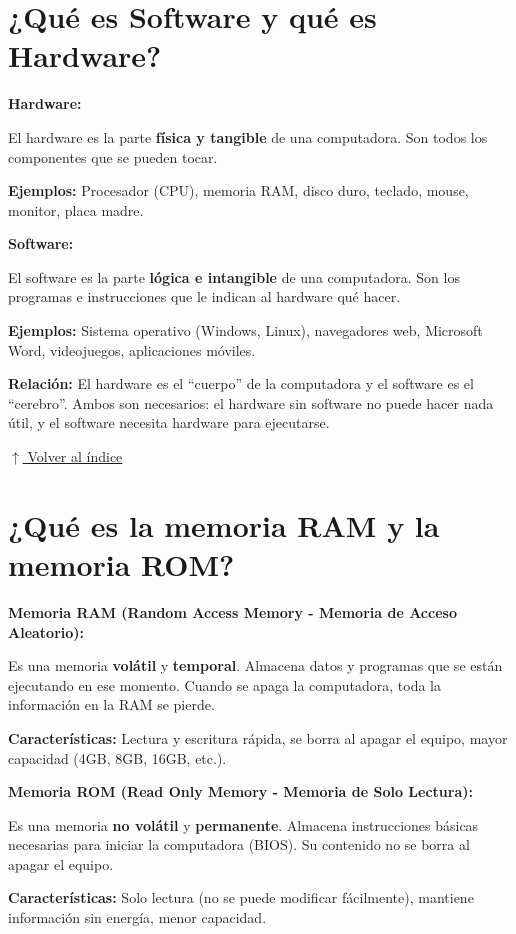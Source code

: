\documentclass[12pt]{article}
\newcommand{\volverindice}{%
    \vspace{1em}%
    \begin{flushright}%
        \hyperlink{indice}{\small $\uparrow$ Volver al índice}%
    \end{flushright}%
}
\begin{document}
\section{¿Qué es Software y qué es Hardware?}

\textbf{Hardware:}

El hardware es la parte \textbf{física y tangible} de una computadora. Son todos los componentes que se pueden tocar.

\textbf{Ejemplos:} Procesador (CPU), memoria RAM, disco duro, teclado, mouse, monitor, placa madre.

\textbf{Software:}

El software es la parte \textbf{lógica e intangible} de una computadora. Son los programas e instrucciones que le indican al hardware qué hacer.

\textbf{Ejemplos:} Sistema operativo (Windows, Linux), navegadores web, Microsoft Word, videojuegos, aplicaciones móviles.

\textbf{Relación:} El hardware es el ``cuerpo'' de la computadora y el software es el ``cerebro''. Ambos son necesarios: el hardware sin software no puede hacer nada útil, y el software necesita hardware para ejecutarse.

\volverindice
\newpage


\section{¿Qué es la memoria RAM y la memoria ROM?}

\textbf{Memoria RAM (Random Access Memory - Memoria de Acceso Aleatorio):}

Es una memoria \textbf{volátil} y \textbf{temporal}. Almacena datos y programas que se están ejecutando en ese momento. Cuando se apaga la computadora, toda la información en la RAM se pierde.

\textbf{Características:} Lectura y escritura rápida, se borra al apagar el equipo, mayor capacidad (4GB, 8GB, 16GB, etc.).

\textbf{Memoria ROM (Read Only Memory - Memoria de Solo Lectura):}

Es una memoria \textbf{no volátil} y \textbf{permanente}. Almacena instrucciones básicas necesarias para iniciar la computadora (BIOS). Su contenido no se borra al apagar el equipo.

\textbf{Características:} Solo lectura (no se puede modificar fácilmente), mantiene información sin energía, menor capacidad.
\end{document}
